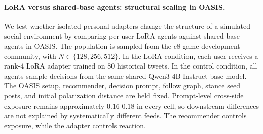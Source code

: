 \begin{table}[tbp]
    \centering
    \small
    \setlength{\tabcolsep}{6pt}
    \renewcommand{\arraystretch}{1.20}
    \caption{Per-user LoRA produces monotonic structural scaling in OASIS as population size increases.}
    \label{tab:oasis-lora-scaling}
\end{table}

\paragraph{LoRA versus shared-base agents: structural scaling in OASIS.}
We test whether isolated personal adapters change the structure of a simulated social environment by comparing per-user LoRA agents against shared-base agents in OASIS. The population is sampled from the c8 game-development community, with \(N \in \{128,256,512\}\). In the LoRA condition, each user receives a rank-4 LoRA adapter trained on 80 historical tweets. In the control condition, all agents sample decisions from the same shared Qwen3-4B-Instruct base model. The OASIS setup, recommender, decision prompt, follow graph, stance seed posts, and initial polarization distance are held fixed. Prompt-level cross-side exposure remains approximately \(0.16\)-\(0.18\) in every cell, so downstream differences are not explained by systematically different feeds. The recommender controls exposure, while the adapter controls reaction.


